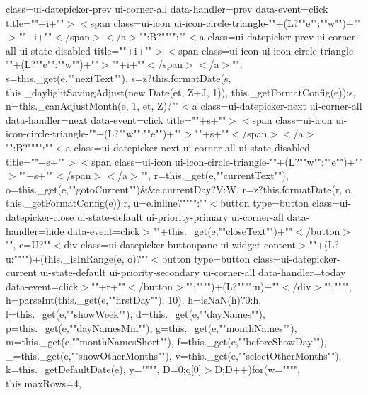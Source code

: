 class=\textquotesingle{}ui-\/datepicker-\/prev ui-\/corner-\/all\textquotesingle{} data-\/handler=\textquotesingle{}prev\textquotesingle{} data-\/event=\textquotesingle{}click\textquotesingle{} title=\textquotesingle{}""+i+""\textquotesingle{}$>$$<$span class=\textquotesingle{}ui-\/icon ui-\/icon-\/circle-\/triangle-\/""+(\+L?""e""\+:""w"")+""\textquotesingle{}$>$""+i+""$<$/span$>$$<$/a$>$""\+:\+B?""""\+:""$<$a class=\textquotesingle{}ui-\/datepicker-\/prev ui-\/corner-\/all ui-\/state-\/disabled\textquotesingle{} title=\textquotesingle{}""+i+""\textquotesingle{}$>$$<$span class=\textquotesingle{}ui-\/icon ui-\/icon-\/circle-\/triangle-\/""+(\+L?""e""\+:""w"")+""\textquotesingle{}$>$""+i+""$<$/span$>$$<$/a$>$"", s=this.\+\_\+get(e,""next\+Text""), s=z?this.\+format\+Date(s, this.\+\_\+daylight\+Saving\+Adjust(new Date(et, Z+\+J, 1)), this.\+\_\+get\+Format\+Config(e))\+:s, n=this.\+\_\+can\+Adjust\+Month(e, 1, et, Z)?""$<$a class=\textquotesingle{}ui-\/datepicker-\/next ui-\/corner-\/all\textquotesingle{} data-\/handler=\textquotesingle{}next\textquotesingle{} data-\/event=\textquotesingle{}click\textquotesingle{} title=\textquotesingle{}""+s+""\textquotesingle{}$>$$<$span class=\textquotesingle{}ui-\/icon ui-\/icon-\/circle-\/triangle-\/""+(\+L?""w""\+:""e"")+""\textquotesingle{}$>$""+s+""$<$/span$>$$<$/a$>$""\+:\+B?""""\+:""$<$a class=\textquotesingle{}ui-\/datepicker-\/next ui-\/corner-\/all ui-\/state-\/disabled\textquotesingle{} title=\textquotesingle{}""+s+""\textquotesingle{}$>$$<$span class=\textquotesingle{}ui-\/icon ui-\/icon-\/circle-\/triangle-\/""+(\+L?""w""\+:""e"")+""\textquotesingle{}$>$""+s+""$<$/span$>$$<$/a$>$"", r=this.\+\_\+get(e,""current\+Text""), o=this.\+\_\+get(e,""goto\+Current"")\&\&e.\+current\+Day?\+V\+:\+W, r=z?this.\+format\+Date(r, o, this.\+\_\+get\+Format\+Config(e))\+:r, u=e.\+inline?""""\+:""$<$button type=\textquotesingle{}button\textquotesingle{} class=\textquotesingle{}ui-\/datepicker-\/close ui-\/state-\/default ui-\/priority-\/primary ui-\/corner-\/all\textquotesingle{} data-\/handler=\textquotesingle{}hide\textquotesingle{} data-\/event=\textquotesingle{}click\textquotesingle{}$>$""+this.\+\_\+get(e,""close\+Text"")+""$<$/button$>$"", c=\+U?""$<$div class=\textquotesingle{}ui-\/datepicker-\/buttonpane ui-\/widget-\/content\textquotesingle{}$>$""+(\+L?u\+:"""")+(this.\+\_\+is\+In\+Range(e, o)?""$<$button type=\textquotesingle{}button\textquotesingle{} class=\textquotesingle{}ui-\/datepicker-\/current ui-\/state-\/default ui-\/priority-\/secondary ui-\/corner-\/all\textquotesingle{} data-\/handler=\textquotesingle{}today\textquotesingle{} data-\/event=\textquotesingle{}click\textquotesingle{}$>$""+r+""$<$/button$>$""\+:"""")+(\+L?""""\+:u)+""$<$/div$>$""\+:"""", h=parse\+Int(this.\+\_\+get(e,""first\+Day""), 10), h=is\+Na\+N(h)?0\+:h, l=this.\+\_\+get(e,""show\+Week""), d=this.\+\_\+get(e,""day\+Names""), p=this.\+\_\+get(e,""day\+Names\+Min""), g=this.\+\_\+get(e,""month\+Names""), m=this.\+\_\+get(e,""month\+Names\+Short""), f=this.\+\_\+get(e,""before\+Show\+Day""), \+\_\+=this.\+\_\+get(e,""show\+Other\+Months""), v=this.\+\_\+get(e,""select\+Other\+Months""), k=this.\+\_\+get\+Default\+Date(e), y="""", D=0;q[0]$>$\+D;\+D++)\lcurly{}for(w="""", this.\+max\+Rows=4, 